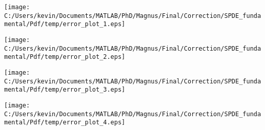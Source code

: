 \begin{landscape}
\texttt{[image: C:/Users/kevin/Documents/MATLAB/PhD/Magnus/Final/Correction/SPDE\_fundamental/Pdf/temp/error\_plot\_1.eps]}
\end{landscape}
\begin{landscape}
\texttt{[image: C:/Users/kevin/Documents/MATLAB/PhD/Magnus/Final/Correction/SPDE\_fundamental/Pdf/temp/error\_plot\_2.eps]}
\end{landscape}
\begin{landscape}
\texttt{[image: C:/Users/kevin/Documents/MATLAB/PhD/Magnus/Final/Correction/SPDE\_fundamental/Pdf/temp/error\_plot\_3.eps]}
\end{landscape}
\begin{landscape}
\texttt{[image: C:/Users/kevin/Documents/MATLAB/PhD/Magnus/Final/Correction/SPDE\_fundamental/Pdf/temp/error\_plot\_4.eps]}
\end{landscape}

